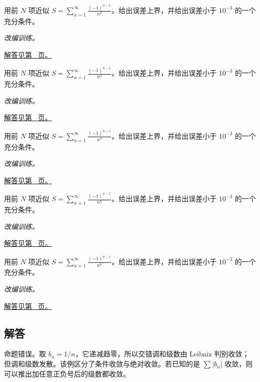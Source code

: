 \documentclass[12pt,fontset=fandol]{ctexart}
\begin{document}
\begin{example}[交错级数的误差控制]\label{ex:c26q21}
用前 $N$ 项近似 $\displaystyle S=\sum_{n=1}^\infty\frac{(-1)^{n-1}}{n^{2}}$。给出误差上界，并给出误差小于 $10^{-3}$ 的一个充分条件。
\par\textit{改编训练。}\par\hyperref[ans:c26q21]{解答见第~\pageref{ans:c26q21} 页。}
\end{example}
\begin{example}[交错级数的误差控制]\label{ex:c26q22}
用前 $N$ 项近似 $\displaystyle S=\sum_{n=1}^\infty\frac{(-1)^{n-1}}{n^{3}}$。给出误差上界，并给出误差小于 $10^{-3}$ 的一个充分条件。
\par\textit{改编训练。}\par\hyperref[ans:c26q22]{解答见第~\pageref{ans:c26q22} 页。}
\end{example}
\begin{example}[交错级数的误差控制]\label{ex:c26q23}
用前 $N$ 项近似 $\displaystyle S=\sum_{n=1}^\infty\frac{(-1)^{n-1}}{n^{4}}$。给出误差上界，并给出误差小于 $10^{-3}$ 的一个充分条件。
\par\textit{改编训练。}\par\hyperref[ans:c26q23]{解答见第~\pageref{ans:c26q23} 页。}
\end{example}
\begin{example}[交错级数的误差控制]\label{ex:c26q24}
用前 $N$ 项近似 $\displaystyle S=\sum_{n=1}^\infty\frac{(-1)^{n-1}}{n^{5}}$。给出误差上界，并给出误差小于 $10^{-3}$ 的一个充分条件。
\par\textit{改编训练。}\par\hyperref[ans:c26q24]{解答见第~\pageref{ans:c26q24} 页。}
\end{example}
\begin{example}[交错级数的误差控制]\label{ex:c26q25}
用前 $N$ 项近似 $\displaystyle S=\sum_{n=1}^\infty\frac{(-1)^{n-1}}{n^{6}}$。给出误差上界，并给出误差小于 $10^{-3}$ 的一个充分条件。
\par\textit{改编训练。}\par\hyperref[ans:c26q25]{解答见第~\pageref{ans:c26q25} 页。}
\end{example}
\subsection{解答}
\begin{solve}\label{ans:c26q1}
命题错误。取 $b_n=1/n$，它递减趋零，所以交错调和级数由 Leibniz 判别收敛；但调和级数发散。该例区分了条件收敛与绝对收敛。若已知的是 $\sum|b_n|$ 收敛，则可以推出加任意正负号后的级数都收敛。
\end{solve}
\end{document}
